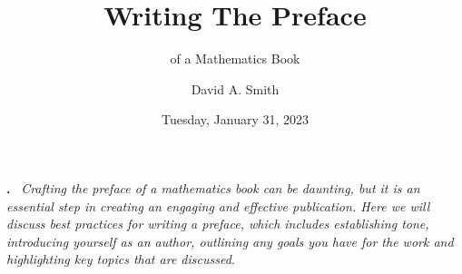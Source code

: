 \documentclass[
  twoside,
  12pt,
  letterpaper,
  fleqn]{article}
\title{Writing The Preface}
\subtitle{of a Mathematics Book}
\author{David A. Smith}
\date{Tuesday, January 31, 2023}
\renewenvironment{abstract}
{\par\noindent\textbf{\abstractname.}\ \ignorespaces \itshape}
{\par\medskip}
\begin{document}
\maketitle
\begin{abstract}
Crafting the preface of a mathematics book can be daunting, but it is an
essential step in creating an engaging and effective publication. Here
we will discuss best practices for writing a preface, which includes
establishing tone, introducing yourself as an author, outlining any
goals you have for the work and highlighting key topics that are
discussed.
\end{abstract}
\ifdefined\Shaded\renewenvironment{Shaded}{\begin{tcolorbox}[boxrule=0pt, interior hidden, frame hidden, borderline west={3pt}{0pt}{shadecolor}, sharp corners, enhanced, breakable]}{\end{tcolorbox}}\fi




\printbibliography



\thispagestyle{empty}
\end{document}
